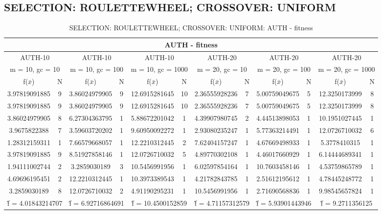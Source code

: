 \subsection{SELECTION: ROULETTEWHEEL; CROSSOVER: UNIFORM}
\begin{table}[H]
	\centering
	\caption{SELECTION: ROULETTEWHEEL; CROSSOVER: UNIFORM: AUTH - fitness}
	\begin{adjustbox}{width=1\textwidth}
		\begin{tabular}{ |c|c||c|c||c|c||c|c||c|c||c|c| }
			\hline
			\multicolumn{12}{|c|}{AUTH - fitness} \\
			\hline
			\multicolumn{2}{|c||}{AUTH-10} & \multicolumn{2}{c||}{AUTH-10} & \multicolumn{2}{c||}{AUTH-10} & \multicolumn{2}{c||}{AUTH-20} & \multicolumn{2}{c||}{AUTH-20} & \multicolumn{2}{c|}{AUTH-20}\\
			\hline
			\multicolumn{2}{|c||}{m = 10, gc = 10} & \multicolumn{2}{c||}{m = 10, gc = 100} & \multicolumn{2}{c||}{m = 10, gc = 1000} & \multicolumn{2}{c||}{m = 20, gc = 10} & \multicolumn{2}{c||}{m = 20, gc = 100} & \multicolumn{2}{c|}{m = 20, gc = 1000}\\
			\hline
			f($\bar{x}$) & N & f($\bar{x}$) & N & f($\bar{x}$) & N & f($\bar{x}$) & N & f($\bar{x}$) & N & f($\bar{x}$) & N\\
			\hline
			\hline
			3.97819091885 & 9 & 3.86024979905 & 9 & 12.6915281645 & 10 & 2.36555928236 & 7 & 5.00759049675 & 5 & 12.3250173999 & 8\\
			\hline
			3.97819091885 & 9 & 3.86024979905 & 9 & 12.6915281645 & 10 & 2.36555928236 & 7 & 5.00759049675 & 5 & 12.3250173999 & 8\\
			3.86024979905 & 8 & 6.27304363795 & 1 & 5.88672201042 & 1 & 4.39907980745 & 2 & 4.44513898053 & 1 & 10.1951027445 & 1\\
			3.9675822388 & 7 & 3.59603720202 & 1 & 9.60950092272 & 1 & 2.93080235247 & 1 & 5.77363214491 & 1 & 12.0726710032 & 6\\
			1.28312159311 & 1 & 7.66579668057 & 1 & 12.2210312445 & 2 & 7.62404157247 & 1 & 4.67669498933 & 1 & 5.3778410315 & 1\\
			3.97819091885 & 9 & 8.51927858146 & 1 & 12.0726710032 & 5 & 4.89770302108 & 1 & 4.46017660929 & 1 & 6.14444689341 & 1\\
			1.94111002744 & 2 & 3.2859030189 & 3 & 10.5456991956 & 1 & 6.02597854164 & 1 & 10.7603458146 & 1 & 4.53759865789 & 1\\
			4.69696195451 & 2 & 12.2210312445 & 1 & 10.3973389543 & 1 & 4.21782843785 & 1 & 2.51612195612 & 1 & 4.78445248772 & 1\\
			3.2859030189 & 8 & 12.0726710032 & 2 & 4.91190295231 & 1 & 10.5456991956 & 1 & 2.71690568836 & 1 & 9.98545657824 & 1\\
			\hline
			\multicolumn{2}{|c||}{\^{f} = 4.01843214707} & \multicolumn{2}{c||}{\^{f} = 6.92716864691} & \multicolumn{2}{c||}{\^{f} = 10.4500152859} & \multicolumn{2}{c||}{\^{f} = 4.71157312579} & \multicolumn{2}{c||}{\^{f} = 5.93901443946} & \multicolumn{2}{c|}{\^{f} = 9.2711356125}\\
			\hline
		\end{tabular}
	\end{adjustbox}
\end{table}
